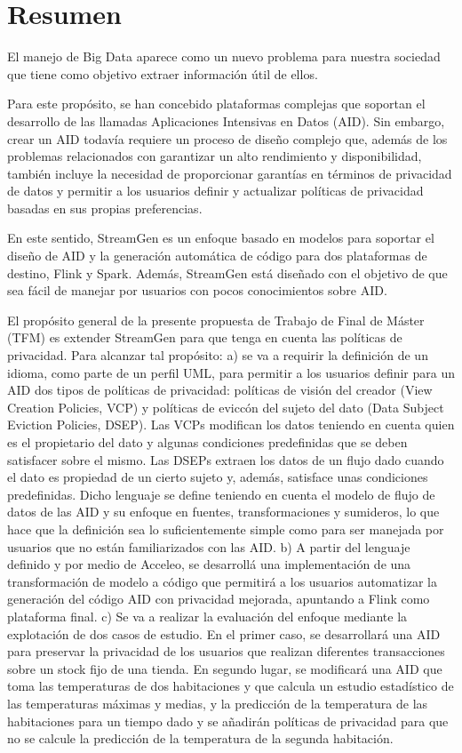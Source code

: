 \documentclass[12pt,twoside]{book}
\begin{document}
\chapter*{Resumen}

El manejo de Big Data aparece como un nuevo problema para nuestra sociedad que tiene como objetivo extraer información útil de ellos. 

Para este propósito, se han concebido plataformas complejas que soportan el desarrollo de las llamadas Aplicaciones Intensivas en Datos (AID). Sin embargo, crear un AID todavía requiere un proceso de diseño complejo que, además de los problemas relacionados con garantizar un alto rendimiento y disponibilidad, también incluye la necesidad de proporcionar garantías en términos de privacidad de datos y permitir a los usuarios definir y actualizar políticas de privacidad basadas en sus propias preferencias.

En este sentido, StreamGen es un enfoque basado en modelos para soportar el diseño de AID y la generación automática de código para dos plataformas de destino, Flink y Spark. Además, StreamGen está diseñado con el objetivo de que sea fácil de manejar por usuarios con pocos conocimientos sobre AID.

El propósito general de la presente propuesta de Trabajo de Final de Máster (TFM) es extender StreamGen para que tenga en cuenta las políticas de privacidad. Para alcanzar tal propósito:
a)  se va a requirir la definición de un idioma, como parte de un perfil UML, para permitir a los usuarios definir para un AID dos tipos de políticas de privacidad: políticas de visión del creador (View Creation Policies, VCP) y políticas de eviccón del sujeto del dato (Data Subject Eviction Policies, DSEP). Las VCPs modifican los datos teniendo en cuenta quien es el propietario del dato y algunas condiciones predefinidas que se deben satisfacer sobre el mismo. Las DSEPs extraen los datos de un flujo dado cuando el dato es propiedad de un cierto sujeto y, además, satisface unas condiciones predefinidas. Dicho lenguaje se define teniendo en cuenta el modelo de flujo de datos de las AID y su enfoque en fuentes, transformaciones y sumideros, lo que hace que la definición sea lo suficientemente simple como para ser manejada por usuarios que no están familiarizados con las AID.
b) A partir del lenguaje definido y por medio de Acceleo, se desarrollá una implementación de una transformación de modelo a código que permitirá a los usuarios automatizar la generación del código AID con privacidad mejorada, apuntando a Flink como plataforma final.
c) Se va a realizar la evaluación del enfoque mediante la explotación de dos casos de estudio. En el primer caso, se desarrollará una AID para preservar la privacidad de los usuarios que realizan diferentes transacciones sobre un stock fijo de una tienda.  En segundo lugar, se modificará una AID que toma las temperaturas de dos habitaciones y que calcula un estudio estadístico de las temperaturas máximas y medias, y la predicción de la temperatura de las habitaciones para un tiempo dado y se añadirán políticas de privacidad para que no se calcule la predicción de la temperatura de la segunda habitación.
\end{document}
